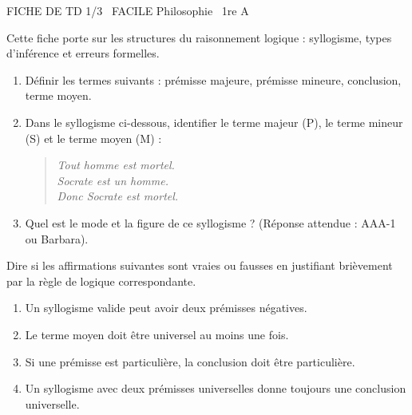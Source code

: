 \documentclass[11pt]{article}
\begin{document}
\begin{tcolorbox}[enhanced,colback=popink,colframe=popink,arc=10pt,boxrule=0pt,left=12pt,right=12pt,top=9pt,bottom=9pt]
{\color{white}\popxbold\small FICHE DE TD 1/3 \textbullet\ FACILE \hfill Philosophie \textbullet\ 1re A\par}
\end{tcolorbox}
\vspace{4pt}
Cette fiche porte sur les structures du raisonnement logique : syllogisme, types d'inférence et erreurs formelles.

\begin{exercice}
\begin{enumerate}
    \item Définir les termes suivants : prémisse majeure, prémisse mineure, conclusion, terme moyen.
    \item Dans le syllogisme ci-dessous, identifier le terme majeur (P), le terme mineur (S) et le terme moyen (M) :
    \begin{quote}
    \textit{Tout homme est mortel. \\
    Socrate est un homme. \\
    Donc Socrate est mortel.}
    \end{quote}
    \item Quel est le mode et la figure de ce syllogisme ? (Réponse attendue : AAA-1 ou Barbara).
\end{enumerate}
\end{exercice}

\begin{exercice}
Dire si les affirmations suivantes sont vraies ou fausses en justifiant brièvement par la règle de logique correspondante.
\begin{enumerate}
    \item Un syllogisme valide peut avoir deux prémisses négatives.
    \item Le terme moyen doit être universel au moins une fois.
    \item Si une prémisse est particulière, la conclusion doit être particulière.
    \item Un syllogisme avec deux prémisses universelles donne toujours une conclusion universelle.
\end{enumerate}
\end{exercice}
\end{document}
